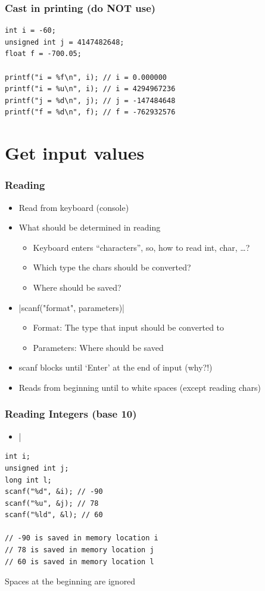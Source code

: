 \documentclass{../c-lecture}
\begin{document}
\begin{frame}[fragile]
  \frametitle{Cast in printing (do NOT use)}
  \begin{verbatim}
int i = -60;
unsigned int j = 4147482648;
float f = -700.05;

printf("i = %f\n", i); // i = 0.000000
printf("i = %u\n", i); // i = 4294967236
printf("j = %d\n", j); // j = -147484648
printf("f = %d\n", f); // f = -762932576
  \end{verbatim}
\end{frame}

\section{Get input values}

\begin{frame}[fragile]
  \frametitle{Reading}
  \begin{itemize}
    \item Read from keyboard (console)
    \item What should be determined in reading
    \begin{itemize}
      \item Keyboard enters ``characters'', so, how to read int, char, …?
      \item Which type the chars should be converted?
      \item Where should be saved?
    \end{itemize}
    \item {}|scanf("format", parameters)|
    \begin{itemize}
      \item Format: The type that input should be converted to
      \item Parameters: Where should be saved
    \end{itemize}
    \item scanf blocks until ‘Enter’ at the end of input (why?!)
    \item Reads from beginning until to white spaces (except reading chars)
  \end{itemize}
\end{frame}

\begin{frame}[fragile]
  \frametitle{Reading Integers (base 10)}
  \begin{itemize}
    \item {}|%
  \end{itemize}
  \begin{verbatim}
int i;
unsigned int j;
long int l;
scanf("%d", &i); // -90
scanf("%u", &j); // 78
scanf("%ld", &l); // 60

// -90 is saved in memory location i
// 78 is saved in memory location j
// 60 is saved in memory location l

  \end{verbatim}
  \begin{block}{}
  Spaces at the beginning are ignored
  \end{block}
\end{frame}
\end{document}
